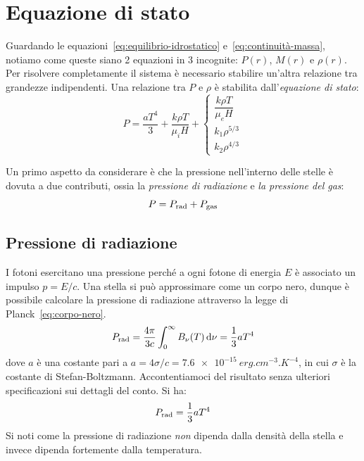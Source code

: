\section{Equazione di stato}\label{sec:equazione-stato}
Guardando le equazioni~\eqref{eq:equilibrio-idrostatico} e~\eqref{eq:continuità-massa}, notiamo come queste siano 2 equazioni in 3 incognite: $P(r)$, $M(r)$ e $\rho(r)$. Per risolvere completamente il sistema è necessario stabilire un'altra relazione tra grandezze indipendenti. Una relazione tra $P$ e $\rho$ è stabilita dall'\emph{equazione di stato}:
\begin{equation}\label{eq:equazione-stato}
    P = \dfrac{aT^4}{3} + \dfrac{k \rho T}{\mu_i H} + 
    \begin{cases} 
    \dfrac{k \rho T}{\mu_e H} \\ 
    k_1 \rho^{5/3} \\ 
    k_2 \rho^{4/3}
    \end{cases}
\end{equation}

Un primo aspetto da considerare è che la pressione nell'interno delle stelle è dovuta a due contributi, ossia la \emph{pressione di radiazione} e \emph{la pressione del gas}:
\[
P = P_\textup{rad} + P_\textup{gas}
\]
\subsection{Pressione di radiazione}
I fotoni esercitano una pressione perché a ogni fotone di energia $E$ è associato un impulso $p = E / c$. Una stella si può approssimare come un corpo nero, dunque è possibile calcolare la pressione di radiazione attraverso la legge di Planck~\eqref{eq:corpo-nero}.
\[
P_\textup{rad} = \frac{4\pi}{3c}\int_0^\infty B_\nu(T) \mathop{\mathrm{{}d}}\mathopen{} \nu = \frac{1}{3} a T^4
\]
dove $a$ è una costante pari a $a = 4 \sigma / c = \SI{7.6e-15}{erg.cm^{-3}.K^{-4}}$, in cui $\sigma$ è la costante di Stefan-Boltzmann. Accontentiamoci del risultato senza ulteriori specificazioni sui dettagli del conto. Si ha:
\begin{equation}\label{eq:pressione-radiazione}
    P_\textup{rad} = \frac{1}{3} a T^4
\end{equation}
Si noti come la pressione di radiazione \emph{non} dipenda dalla densità della stella e invece dipenda fortemente dalla temperatura.

